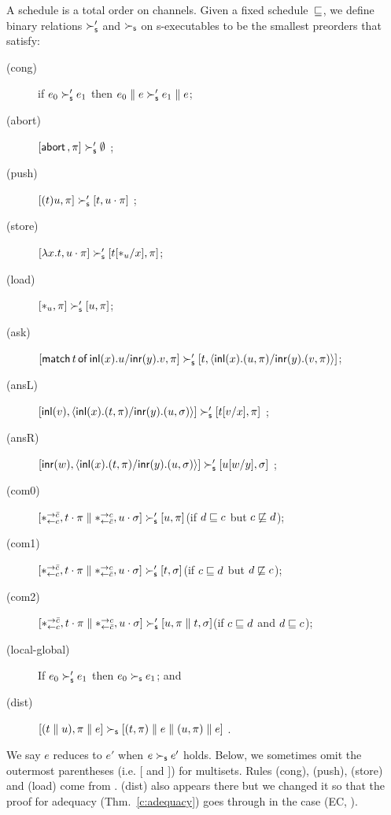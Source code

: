 \documentclass[envcountsame]{llncs}
\begin{document}
A schedule is a total order on channels.
Given a fixed schedule~$\sqsubseteq$,
we define binary relations $\succ_{\mathsf s}'$ and $\succ_{\mathsf s}$
on s-executables
to be the smallest preorders
that satisfy:
\begin{description}
 \item[(cong)] if
      $e_0         \succ_{\mathsf s}' e_1$
      then
      $e_0 \parallel e \succ_{\mathsf s}' e_1\parallel e$\enspace;
 \item[(abort)] $[\mathsf{abort\,},\pi]\succ_{\mathsf s}' \emptyset$ \enspace;
 \item[(push)]
	    $[(t)u,\pi]      \succ_{\mathsf s}' [t,u\cdot\pi]$      \enspace;
 \item[(store)]
	    $[\lambda x.t,u\cdot\pi]
	     \succ_{\mathsf s}'
	     [t[\ast_u/x],      \pi]$\enspace;
 \item[(load)]
	    $[\ast_u,\pi]\succ_{\mathsf s}' [u,\pi]$\enspace;
 \item[(ask)]
      $[\mathsf{match}\,{t}\,\mathsf{of}\, \mathsf{inl}({x}). {u}/ \mathsf{inr}({y}). {v},\pi]\succ_{\mathsf s}' [t,\langle \mathsf{inl}({x}). ({u},{\pi})/ \mathsf{inr}({y}). ({v},{\pi})\rangle]$\enspace;
 \item[(ansL)]
           $[\mathsf{inl}({v}), \langle \mathsf{inl}({x}). ({t},{\pi})/ \mathsf{inr}({y}). ({u},{\sigma})\rangle] \succ_{\mathsf s}' [t[v/x],\pi] $ \enspace;
 \item[(ansR)]
           $[\mathsf{inr}({w}), \langle \mathsf{inl}({x}). ({t},{\pi})/ \mathsf{inr}({y}). ({u},{\sigma})\rangle] \succ_{\mathsf s}' [u[w/y],\sigma] $ \enspace;
 \item[(com0)]
           $[\ast^{\rightarrow {\bar{c}}}_{\leftarrow{c}}, t\cdot\pi\parallel \ast^{\rightarrow {c}}_{\leftarrow{\bar{c}}},
           u\cdot\sigma] \succ_{\mathsf s}'
           [u,\pi]$\enspace(if $d\sqsubseteq c$ but $c\not\sqsubseteq d$)\enspace;
 \item[(com1)]
	    $[\ast^{\rightarrow {\bar{c}}}_{\leftarrow{c}}, t\cdot\pi\parallel \ast^{\rightarrow {c}}_{\leftarrow{\bar{c}}},
	    u\cdot\sigma] \succ_{\mathsf s}'
	    [t,\sigma]$\enspace(if $c\sqsubseteq d$ but $d\not\sqsubseteq c$)\enspace;
 \item[(com2)]
	    $[\ast^{\rightarrow {\bar{c}}}_{\leftarrow{c}}, t\cdot\pi\parallel \ast^{\rightarrow {c}}_{\leftarrow{\bar{c}}},
	    u\cdot\sigma] \succ_{\mathsf s}'
	    [u,\pi\parallel t,\sigma]$\enspace(if $c\sqsubseteq d$ and $d\sqsubseteq
       c$)\enspace;
 \item[(local-global)] If $e_0\succ_{\mathsf s}'e_1$ then $e_0\succ_{\mathsf s} e_1$\enspace; and
 \item[(dist)]
           $[(t\parallel u),\pi\parallel e]  \succ_{\mathsf s} [(t,\pi)\parallel e\parallel (u,\pi)\parallel
      e]$ \enspace.
\end{description}
We say $e$ reduces to $e'$ when $e\succ_{\mathsf s} e'$ holds.
Below, we sometimes omit the outermost parentheses (i.e. [ and ]) for multisets.
Rules (cong), (push), (store) and (load) come from
\citet{danos-krivine}.  (dist) also appears there but we changed it so
that the proof for adequacy (Thm.~\ref{c:adequacy}) goes through in the
case (EC, \textminus).
\end{document}
